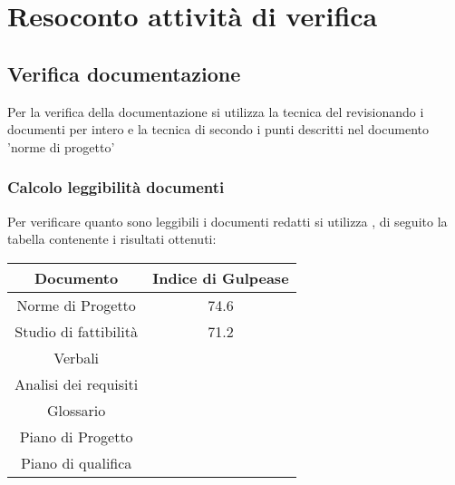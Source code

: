 \section{Resoconto attività di verifica}

\subsection{Verifica documentazione}
Per la verifica della documentazione si utilizza la tecnica del  revisionando i documenti per intero e la tecnica di  secondo i punti descritti nel documento 'norme di progetto'

\subsubsection{Calcolo leggibilità documenti}
Per verificare quanto sono leggibili i documenti redatti si utilizza , di seguito la tabella contenente i risultati ottenuti:

\begin{center}
	\begin{longtable}{|c|c|}
	\hline
	\rowcolor{lighter-grayer}
	\textbf{Documento} & \textbf{Indice di Gulpease} \\
	\hline
	\endfirsthead

	\hline
	Norme di Progetto &  74.6 \\
	\hline
	\hline
	Studio di fattibilità & 71.2 \\
	\hline
	\hline
	Verbali &  \\
	\hline
	\hline
	Analisi dei requisiti &  \\
	\hline
	\hline
	Glossario &  \\
	\hline
	\hline
	Piano di Progetto &  \\
	\hline
	\hline
	Piano di qualifica &  \\
	\hline

	\end{longtable}
\end{center}